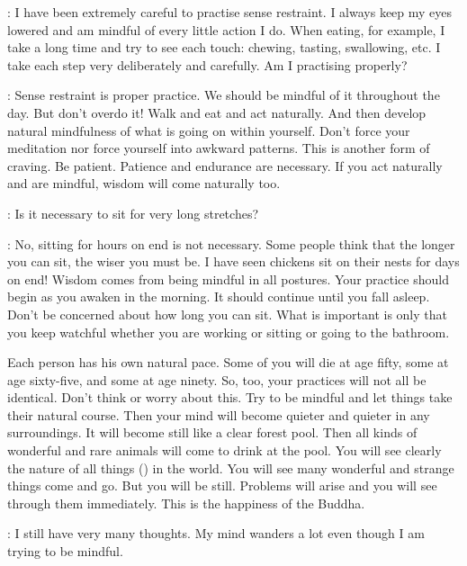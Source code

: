 :
I have been extremely careful to practise sense restraint. I always keep my eyes lowered and am mindful of every little action I do. When eating, for example, I take a long time and try to see each touch: chewing, tasting, swallowing, etc. I take each step very deliberately and carefully. Am I practising properly? 

: Sense restraint is proper practice. We should be mindful of it throughout the day. But don't overdo it! Walk and eat and act naturally. And then develop natural mindfulness of what is going on within yourself. Don't force your meditation nor force yourself into awkward patterns. This is another form of craving. Be patient. Patience and endurance are necessary. If you act naturally and are mindful, wisdom will come naturally too. 

:
Is it necessary to sit for very long stretches? 

: No, sitting for hours on end is not necessary. Some people think that the longer you can sit, the wiser you must be. I have seen chickens sit on their nests for days on end! Wisdom comes from being mindful in all postures. Your practice should begin as you awaken in the morning. It should continue until you fall asleep. Don't be concerned about how long you can sit. What is important is only that you keep watchful whether you are working or sitting or going to the bathroom. 

Each person has his own natural pace. Some of you will die at age fifty, some at age sixty-five, and some at age ninety. So, too, your practices will not all be identical. Don't think or worry about this. Try to be mindful and let things take their natural course. Then your mind will become quieter and quieter in any surroundings. It will become still like a clear forest pool. Then all kinds of wonderful and rare animals will come to drink at the pool. You will see clearly the nature of all things () in the world. You will see many wonderful and strange things come and go. But you will be still. Problems will arise and you will see through them immediately. This is the happiness of the Buddha. 

:
I still have very many thoughts. My mind wanders a lot even though I am trying to be mindful. 

